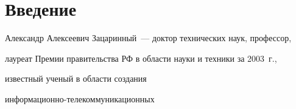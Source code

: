 







      \thispagestyle{headings}





      


            \label{st\stat}


            


            \vspace*{-24pt}








\section{Введение}


















Александр Алексеевич За\-ца\-рин\-ный~--- доктор технических наук, про\-фес\-сор, 


лауреат Премии правительства РФ в об\-ласти науки и техники за 2003~г., 


из\-вест\-ный ученый в области созда\-ния 


ин\-фор\-ма\-ци\-он\-но-те\-ле\-ком\-му\-ни\-ка\-ци\-он\-ных %


